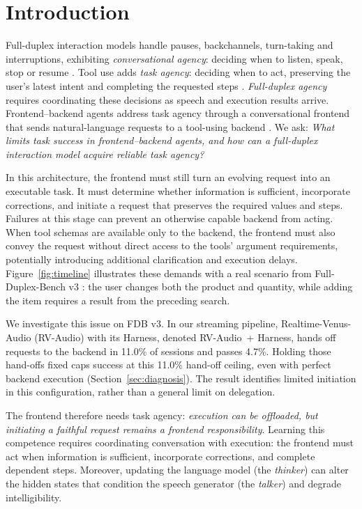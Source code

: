 \section{Introduction}
\label{sec:intro}

Full-duplex interaction models handle pauses, backchannels, turn-taking and interruptions, exhibiting \emph{conversational agency}: deciding when to listen, speak, stop or resume \citep{defossez2024moshi,cui2026minicpmo45,lin2025fullduplexbench,lin2025fdbv15}.
Tool use adds \emph{task agency}: deciding when to act, preserving the user's latest intent and completing the requested steps \citep{yao2024taubench,lin2026fdbv3}.
\emph{Full-duplex agency} requires coordinating these decisions as speech and execution results arrive.
Frontend--backend agents address task agency through a conversational frontend that sends natural-language requests to a tool-using backend \citep{venus2026realtimevenus,huang2026duplexomni,hu2026frontendbackend}.
We ask: \emph{What limits task success in frontend--backend agents, and how can a full-duplex interaction model acquire reliable task agency?}



In this architecture, the frontend must still turn an evolving request into an executable task.
It must determine whether information is sufficient, incorporate corrections, and initiate a request that preserves the required values and steps.
Failures at this stage can prevent an otherwise capable backend from acting.
When tool schemas are available only to the backend, the frontend must also convey the request without direct access to the tools' argument requirements, potentially introducing additional clarification and execution delays.
Figure~\ref{fig:timeline} illustrates these demands with a real scenario from Full-Duplex-Bench v3 \citep[FDB v3;][]{lin2026fdbv3}: the user changes both the product and quantity, while adding the item requires a result from the preceding search.


We investigate this issue on FDB v3.
In our streaming pipeline, Realtime-Venus-Audio (RV-Audio) with its Harness, denoted RV-Audio~+ Harness, hands off requests to the backend in 11.0\% of sessions and passes 4.7\%.
Holding those hand-offs fixed caps success at this 11.0\% hand-off ceiling, even with perfect backend execution (Section~\ref{sec:diagnosis}).
The result identifies limited initiation in this configuration, rather than a general limit on delegation.

The frontend therefore needs task agency: \emph{execution can be offloaded, but initiating a faithful request remains a frontend responsibility}.
Learning this competence requires coordinating conversation with execution: the frontend must act when information is sufficient, incorporate corrections, and complete dependent steps.
Moreover, updating the language model (the \emph{thinker}) can alter the hidden states that condition the speech generator (the \emph{talker}) and degrade intelligibility.

